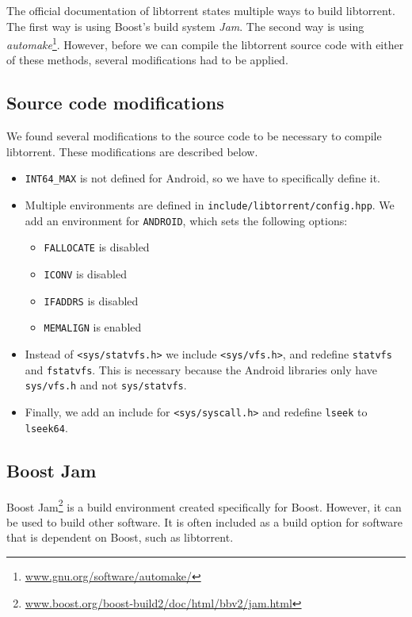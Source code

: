 		The official documentation of libtorrent states multiple ways to build libtorrent. The first way is using Boost's build system \emph{Jam}. The second way is using \emph{automake}\footnote{\href{http://www.gnu.org/software/automake/}{www.gnu.org/software/automake/}}. However, before we can compile the libtorrent source code with either of these methods, several modifications had to be applied.
		
		\subsection{Source code modifications}
				
		We found several modifications to the source code to be necessary to compile libtorrent. These modifications are described below.
		
		\begin{itemize}
		\item \texttt{INT64\_MAX} is not defined for Android, so we have to specifically define it.
		\item Multiple environments are defined in \texttt{include/libtorrent/config.hpp}. We add an environment for \texttt{ANDROID}, which sets the following options:
			\begin{itemize}
				\item \texttt{FALLOCATE} is disabled
				\item \texttt{ICONV} is disabled
				\item \texttt{IFADDRS} is disabled
				\item \texttt{MEMALIGN} is enabled
			\end{itemize}
		\item Instead of \texttt{<sys/statvfs.h>} we include \texttt{<sys/vfs.h>}, and redefine \texttt{statvfs} and \texttt{fstatvfs}. This is necessary because the Android libraries only have \texttt{sys/vfs.h} and not \texttt{sys/statvfs}.
		\item Finally, we add an include for \texttt{<sys/syscall.h>} and redefine \texttt{lseek} to \texttt{lseek64}.
		\end{itemize}
		
		\subsection{Boost Jam}
		Boost Jam\footnote{\href{http://www.boost.org/boost-build2/doc/html/bbv2/jam.html}{www.boost.org/boost-build2/doc/html/bbv2/jam.html}} is a build environment created specifically for Boost. However, it can be used to build other software. It is often included as a build option for software that is dependent on Boost, such as libtorrent.
		
